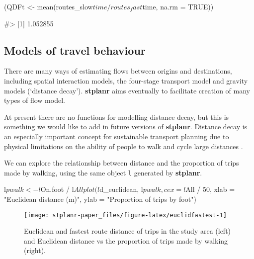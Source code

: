 \begin{Schunk}
\begin{Sinput}
(QDFt <- mean(routes_slow$time / routes_fast$time, na.rm = TRUE))
\end{Sinput}
\begin{Soutput}
#> [1] 1.052855
\end{Soutput}
\end{Schunk}

\subsection{Models of travel
behaviour}\label{models-of-travel-behaviour}

There are many ways of estimating flows between origins and
destinations, including spatial interaction models, the four-stage
transport model and gravity models (`distance decay'). \textbf{stplanr}
aims eventually to facilitate creation of many types of flow model.

At present there are no functions for modelling distance decay, but this
is something we would like to add in future versions of
\textbf{stplanr}. Distance decay is an especially important concept for
sustainable transport planning due to physical limitations on the
ability of people to walk and cycle large distances
\citep{iacono_measuring_2010}.

We can explore the relationship between distance and the proportion of
trips made by walking, using the same object \texttt{l} generated by
\textbf{stplanr}.

\begin{Schunk}
\begin{Sinput}
l$pwalk <- l$On.foot / l$All
plot(l$d_euclidean, l$pwalk, cex = l$All / 50,
  xlab = "Euclidean distance (m)", ylab = "Proportion of trips by foot")
\end{Sinput}
\end{Schunk}

\begin{Schunk}
\begin{figure}
\texttt{[image: stplanr-paper\_files/figure-latex/euclidfastest-1]} \caption[Euclidean and fastest route distance of trips in the study area (left) and Euclidean distance vs the proportion of trips made by walking (right)]{Euclidean and fastest route distance of trips in the study area (left) and Euclidean distance vs the proportion of trips made by walking (right).}\label{fig:euclidfastest}
\end{figure}
\end{Schunk}

